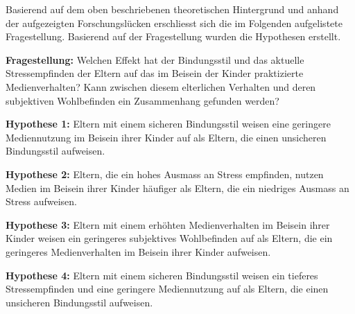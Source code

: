 Basierend auf dem oben beschriebenen theoretischen Hintergrund und anhand der aufgezeigten Forschungslücken erschliesst sich die im Folgenden aufgelistete Fragestellung. Basierend auf der Fragestellung wurden die Hypothesen erstellt.

\textbf{Fragestellung:}
Welchen Effekt hat der Bindungsstil und das aktuelle Stressempfinden der Eltern auf das im Beisein der Kinder praktizierte Medienverhalten? Kann zwischen diesem elterlichen Verhalten und deren subjektiven Wohlbefinden ein Zusammenhang gefunden werden?

\textbf{Hypothese 1:}
Eltern mit einem sicheren Bindungsstil weisen eine geringere Mediennutzung im Beisein ihrer Kinder auf als Eltern, die einen unsicheren Bindungsstil aufweisen.

\textbf{Hypothese 2:}
Eltern, die ein hohes Ausmass an Stress empfinden, nutzen Medien im Beisein ihrer Kinder häufiger als Eltern, die ein niedriges Ausmass an Stress aufweisen.

\textbf{Hypothese 3:}
Eltern mit einem erhöhten Medienverhalten im Beisein ihrer Kinder weisen ein geringeres subjektives Wohlbefinden auf als Eltern, die ein geringeres Medienverhalten im Beisein ihrer Kinder aufweisen.

\textbf{Hypothese 4:} 
Eltern mit einem sicheren Bindungsstil weisen ein tieferes Stressempfinden und eine geringere Mediennutzung auf als Eltern, die einen unsicheren Bindungsstil aufweisen.

